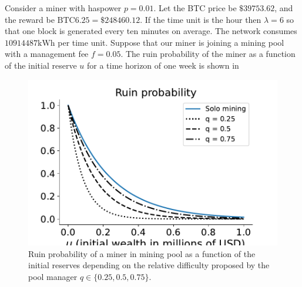 \begin{ex}\label{ex:miner_in_pool}
Consider a miner with haspower $p = 0.01$. Let the BTC price be $\$39753.62$, and the reward be $\text{BTC}6.25 = \$248460.12$. If the time unit is the hour then $\lambda = 6$ so that one block is generated every ten minutes on average. The network consumes $10914487\text{kWh}$ per time unit. Suppose that our miner is joining a mining pool with a management fee $f = 0.05$. The ruin probability of the miner as a function of the initial reserve $u$ for a time horizon of one week is shown in 
\begin{figure}[!ht]
  \begin{center}
 
      \includegraphics[width = \textwidth]{../Figures/rp_miner_in_pool}
      
                         
    \caption{Ruin probability of a miner in mining pool as a function of the initial reserves depending on the relative difficulty proposed by the pool manager $q\in \{0.25, 0.5, 0.75\}$.}
    \label{fig:rp_miner_in_pool}
  \end{center}
\end{figure}
\end{ex}


